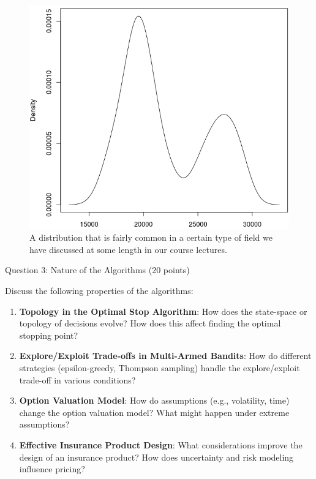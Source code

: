 \documentclass[12pt]{exam}
\begin{document}
\begin{questions}
\begin{figure}
    \centering
    \includegraphics[width=0.75\linewidth]{interesting_distribution.png}
    \caption{A distribution that is fairly common in a certain type of field we have discussed at some length in our course lectures.}
    \label{fig:distribution}
\end{figure}


\question[20] Question 3: Nature of the Algorithms (20 points)

Discuss the following properties of the algorithms:

\begin{enumerate}
    \item \textbf{Topology in the Optimal Stop Algorithm}: How does the state-space or topology of decisions evolve? How does this affect finding the optimal stopping point?
    \item \textbf{Explore/Exploit Trade-offs in Multi-Armed Bandits}: How do different strategies (epsilon-greedy, Thompson sampling) handle the explore/exploit trade-off in various conditions?
    \item \textbf{Option Valuation Model}: How do assumptions (e.g., volatility, time) change the option valuation model? What might happen under extreme assumptions?
    \item \textbf{Effective Insurance Product Design}: What considerations improve the design of an insurance product? How does uncertainty and risk modeling influence pricing?
\end{enumerate}









\end{questions}
\end{document}
